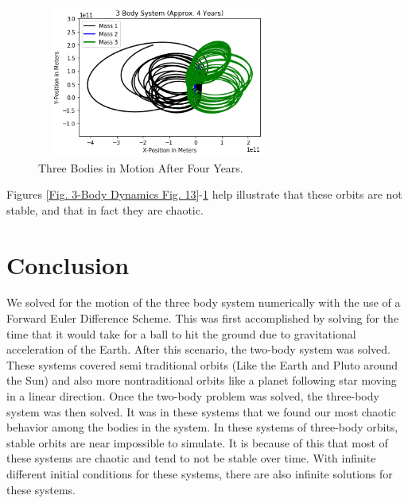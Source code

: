 \documentclass[twocolumn]{article}
\begin{document}
\begin{figure}[ht]
    \centering
    \includegraphics[width=8cm, height=5cm]{Figures/3-Body Dynamics (15).png}
    \caption{\small{Three Bodies in Motion After Four Years.}}
    \label{Fig. 3-Body Dynamics Fig. 15}
\end{figure}
\par \noindent
Figures \ref{Fig. 3-Body Dynamics Fig. 13}-\ref{Fig. 3-Body Dynamics Fig. 15} help illustrate that these orbits are not stable, and that in fact they are chaotic.
\section{Conclusion}
We solved for the motion of the three body system numerically with the use of a Forward Euler Difference Scheme. This was first accomplished by solving for the time that it would take for a ball to hit the ground due to gravitational acceleration of the Earth. After this scenario, the two-body system was solved. These systems covered semi traditional orbits (Like the Earth and Pluto around the Sun) and also more nontraditional orbits like a planet following star moving in a linear direction. Once the two-body problem was solved, the three-body system was then solved. It was in these systems that we found our most chaotic behavior among the bodies in the system. In these systems of three-body orbits, stable orbits are near impossible to simulate. It is because of this that most of these systems are chaotic and tend to not be stable over time. With infinite different initial conditions for these systems, there are also infinite solutions for these systems.
\clearpage
{}
\end{document}
